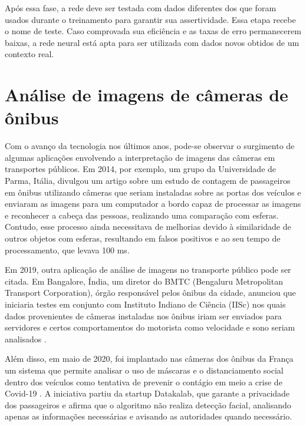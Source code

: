 \par Após essa fase, a rede deve ser testada com dados diferentes dos que foram usados durante o treinamento para garantir sua assertividade. Essa etapa recebe o nome de teste. Caso comprovada sua eficiência e as taxas de erro permanecerem baixas, a rede neural está apta para ser utilizada com dados novos obtidos de um contexto real.



\section{Análise de imagens de câmeras de ônibus}

\indent
\par Com o avanço da tecnologia nos últimos anos, pode-se observar o surgimento de algumas aplicações envolvendo a interpretação de imagens das câmeras em transportes públicos. Em 2014, por exemplo, um grupo da Universidade de Parma, Itália, divulgou um artigo \cite{Bernini2014} sobre um estudo de contagem de passageiros em ônibus utilizando câmeras que seriam instaladas sobre as portas dos veículos e enviaram as imagens para um computador a bordo capaz de processar as imagens e reconhecer a cabeça das pessoas, realizando uma comparação com esferas. Contudo, esse processo ainda necessitava de melhorias devido à similaridade de outros objetos com esferas, resultando em falsos positivos e ao seu tempo de processamento, que levava 100 ms.

\par Em 2019, outra aplicação de análise de imagens no transporte público pode ser citada. Em Bangalore, Índia,  um diretor do BMTC (Bengaluru Metropolitan Transport Corporation), órgão responsável pelos ônibus da cidade, anunciou que iniciaria testes em conjunto com Instituto Indiano de Ciência (IISc) nos quais dados provenientes de câmeras instaladas nos ônibus iriam ser enviados para servidores e certos comportamentos do motorista como velocidade e sono seriam analisados \cite{Prasad2019}.

\par Além disso, em maio de 2020, foi implantado nas câmeras dos ônibus da França um sistema que permite analisar o uso de máscaras e o distanciamento social dentro dos veículos como tentativa de prevenir o contágio em meio a crise de Covid-19 \cite{BBC2020}. A iniciativa partiu da startup Datakalab, que garante a privacidade dos passageiros e afirma que o algoritmo não realiza detecção facial, analisando apenas as informações necessárias e avisando as autoridades quando necessário.

